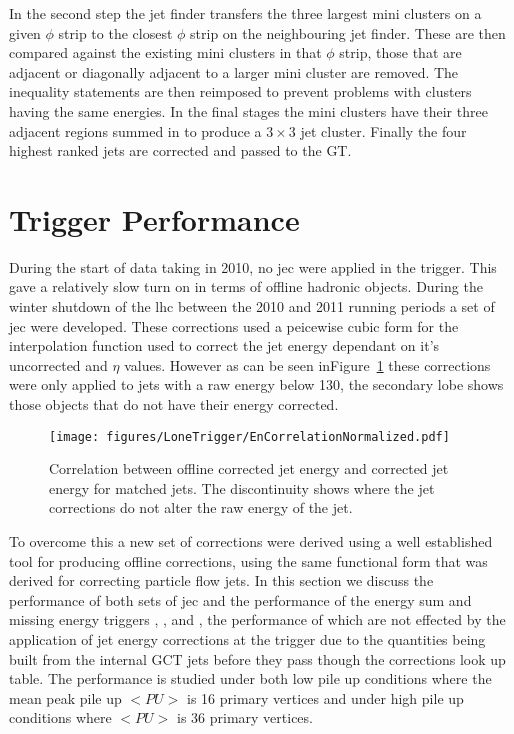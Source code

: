 In the second step the jet finder transfers the three largest mini clusters on 
a given $\phi$ strip to the closest $\phi$ strip on the neighbouring jet finder.
These are then compared against the existing mini clusters in that $\phi$ strip,
those that are adjacent or diagonally adjacent to a larger mini cluster are 
removed. The inequality statements are then reimposed to prevent problems
with clusters having the same energies. In the final stages the mini clusters
have their three adjacent regions summed in to produce a $3 \times 3$ jet
cluster. Finally the four highest ranked jets are corrected and passed to the 
GT.

\section{\Lone Trigger Performance} %

During the start of data taking in 2010, no \ac{jec} were 
applied in the \Lone trigger. This gave a relatively slow turn on in terms of 
offline hadronic objects.
During the winter shutdown of the \ac{lhc} between the 2010 and 2011 running 
periods a set of \Lone \ac{jec} were developed. These corrections used a peicewise cubic form for the interpolation function used to correct the jet energy dependant on it's uncorrected \ET and $\eta$ values. However as can be seen inFigure~\ref{fig:figures_LoneTrigger_EnCorrelationNormalized} these corrections were only applied to jets with a raw energy below \unit{130}{\GeV}, the secondary lobe shows those objects that do not have their energy corrected.

\begin{figure}[htbp]
  \centering
    \texttt{[image: figures/LoneTrigger/EnCorrelationNormalized.pdf]}
  \caption{Correlation between offline corrected jet energy and \Lone corrected jet energy for matched jets. The discontinuity shows where the \Lone jet corrections do not alter the raw energy of the jet.}
  \label{fig:figures_LoneTrigger_EnCorrelationNormalized}
\end{figure}

To overcome this a new set of corrections were derived using a well established 
tool for producing offline corrections, 
using the same functional form that was derived for correcting particle flow 
jets\cite{PAS-JME-10-010}.%
In this section we discuss the performance of both sets of \Lone \ac{jec} and 
the performance of the energy sum and missing energy triggers \HT, \HTm, and 
\MET, the performance of which are not effected by the application of jet 
energy corrections at the \Lone trigger due to the quantities being built from 
the internal GCT jets before they pass though the corrections look up table.
The performance is studied under both low pile up conditions where the mean 
peak pile up $<PU>$ is 16 primary vertices and under high pile up conditions 
where $<PU>$ is 36 primary vertices.

